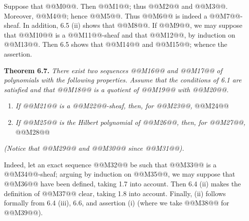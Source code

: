 Suppose that @@M0@@. Then @@M1@@; thus @@M2@@ and @@M3@@. Moreover, @@M4@@; hence @@M5@@. Thus @@M6@@ is indeed a @@M7@@-sheaf. In addition, 6.5 (ii) shows that @@M8@@. If @@M9@@, we may suppose that @@M10@@ is a @@M11@@-sheaf and that @@M12@@, by induction on @@M13@@. Then 6.5 shows that @@M14@@ and @@M15@@; whence the assertion.

\textbf{Theorem 6.7.} \emph{There exist two sequences @@M16@@ and @@M17@@ of polynomials with the following properties. Assume that the conditions of 6.1 are satisfied and that @@M18@@ is a quotient of @@M19@@ with @@M20@@.}
\begin{enumerate}[label=(\roman*)]
\item \emph{If @@M21@@ is a @@M22@@-sheaf, then, for @@M23@@,}
@@M24@@
\item \emph{If @@M25@@ is the Hilbert polynomial of @@M26@@, then, for @@M27@@,}
@@M28@@
\end{enumerate}
\emph{(Notice that @@M29@@ and @@M30@@ since @@M31@@).}

Indeed, let an exact sequence @@M32@@ be such that @@M33@@ is a @@M34@@-sheaf; arguing by induction on @@M35@@, we may suppose that @@M36@@ have been defined, taking 1.7 into account. Then 6.4 (ii) makes the definition of @@M37@@ clear, taking 1.8 into account. Finally, (ii) follows formally from 6.4 (iii), 6.6, and assertion (i) (where we take @@M38@@ for @@M39@@).

